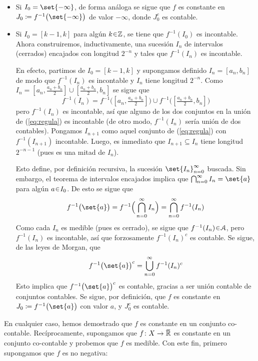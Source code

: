 \begin{sol}
\begin{itemize}
\item Si $I_0 = \set{-\infty}$, de forma análoga se sigue que $f$ es constante en $J_0 \coloneq f^{-1}\big(\set{-\infty}\big)$ de valor $-\infty$, donde $J^c_0$ es contable.

\item Si $I_0 = [k-1,k]$ para algún $k\en\mathbb{Z}$, se tiene que $f^{-1}(I_0)$ es incontable. Ahora construiremos, inductivamente, una sucesión $I_n$ de intervalos (cerrados) encajados con longitud $2^{-n}$ y tales que $f^{-1}(I_n)$ es incontable.\par
En efecto, partimos de $I_0 = [k-1,k]$ y supongamos definido $I_n = [a_n,b_n]$ de modo que $f^{-1}(I_n)$ es incontable y $I_n$ tiene longitud $2^{-n}$. Como $I_n = [a_n,\frac{a_n+b_n}{2}] \cup [\frac{a_n+b_n}{2},b_n]$ se sigue que
\begin{equation}\label{eq:regula}
f^{-1}(I_n) = f^{-1}\big([a_n,\tfrac{a_n+b_n}{2}]\big) \cup f^{-1}\big([\tfrac{a_n+b_n}{2},b_n]\big)
\end{equation}
pero $f^{-1}(I_n)$ es incontable, así que alguno de los dos conjuntos en la unión de (\ref{eq:regula}) es incontable (de otro modo, $f^{-1}(I_n)$ sería unión de dos contables). Pongamos $I_{n+1}$ como aquel conjunto de (\ref{eq:regula}) con $f^{-1}(I_{n+1})$ incontable. Luego, es inmediato que $I_{n+1} \subseteq I_n$ tiene longitud $2^{-n-1}$ (pues es una mitad de $I_n$).\par
Esto define, por definición recursiva, la sucesión $\set{I_n}^\infty_{n=0}$ buscada. Sin embargo, el teorema de intervalos encajados implica que $\bigcap^\infty_{n=0} I_n = \set{a}$ para algún $a \en I_0$. De esto se sigue que 
\[
f^{-1}\big(\set{a}\big) = f^{-1}\Big(\bigcap^\infty_{n=0} I_n\Big) = \bigcap^\infty_{n=0} f^{-1}(I_n)
\]
Como cada $I_n$ es medible (pues es cerrado), se sigue que $f^{-1}(I_n)\en\mathcal{A}$, pero $f^{-1}(I_n)$ es incontable, así que forzosamente $f^{-1}(I_n)^c$ es contable. Se sigue, de las leyes de Morgan, que 
\[
f^{-1}\big(\set{a}\big)^c = \bigcup^\infty_{n=0} f^{-1}(I_n)^c
\]
Esto implica que $f^{-1}\big(\set{a}\big)^c$ es contable, gracias a ser unión contable de conjuntos contables. Se sigue, por definición, que $f$ es constante en $J_0 \coloneq f^{-1}\big(\set{a}\big)$ con valor $a$, y $J^c_0$ es contable.
\end{itemize}
En cualquier caso, hemos demostrado que $f$ es constante en un conjunto co-contable. Recíprocamente, supongamos que $f \colon X \to \ubar{\mathbb{R}}$ es constante en un conjunto co-contable y probemos que $f$ es medible. Con este fin, primero supongamos que $f$ es no negativa:\par

\end{sol}
